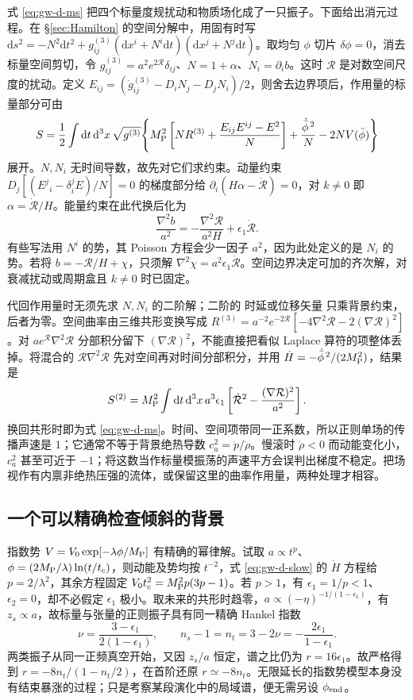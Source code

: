式 \eqref{eq:gw-d-ms} 把四个标量度规扰动和物质场化成了一只振子。下面给出消元过程。在 \S\ref{sec:Hamilton} 的空间分解中，用固有时写 $\mathrm ds^2=-N^2\mathrm dt^2+g^{(3)}_{ij}(\mathrm dx^i+N^i\mathrm dt)(\mathrm dx^j+N^j\mathrm dt)$。取均匀 $\phi$ 切片 $\delta\phi=0$，消去标量空间剪切，令 $g^{(3)}_{ij}=a^2e^{2\mathcal R}\delta_{ij}$、$N=1+\alpha$、$N_i=\partial_i b$。这时 $\mathcal R$ 是对数空间尺度的扰动。定义 $E_{ij}=(\dot g^{(3)}_{ij}-D_iN_j-D_jN_i)/2$，则舍去边界项后，作用量的标量部分可由
\[
 S=\frac12\int\mathrm dt\,\mathrm d^3x\,\sqrt{g^{(3)}}\!
 \left\{M_{\rm P}^2\left[N R^{(3)}+\frac{E_{ij}E^{ij}-E^2}{N}\right]
       +\frac{\dot{\bar\phi}^{\,2}}{N}-2NV(\bar\phi)\right\}
\]
展开。$N,N_i$ 无时间导数，故先对它们求约束。动量约束 $D_j[(E^j{}_i-\delta^j_i E)/N]=0$ 的梯度部分给 $\partial_i(H\alpha-\dot{\mathcal R})=0$，对 $k\ne0$ 即 $\alpha=\dot{\mathcal R}/H$。能量约束在此代换后化为
\[
 \frac{\nabla^2 b}{a^2}=-\frac{\nabla^2\mathcal R}{a^2H}
                       +\epsilon_1\dot{\mathcal R}.
\]
有些写法用 $N^i$ 的势，其 Poisson 方程会少一因子 $a^2$，因为此处定义的是 $N_i$ 的势。若将 $b=-\mathcal R/H+\chi$，只须解 $\nabla^2\chi=a^2\epsilon_1\dot{\mathcal R}$。空间边界决定可加的齐次解，对衰减扰动或周期盒且 $k\ne0$ 时已固定。

代回作用量时无须先求 $N,N_i$ 的二阶解；二阶的 时延或位移矢量 只乘背景约束，后者为零。空间曲率由三维共形变换写成 $R^{(3)}=a^{-2}e^{-2\mathcal R}[-4\nabla^2\mathcal R-2(\nabla\mathcal R)^2]$。对 $a e^{\mathcal R}\nabla^2\mathcal R$ 分部积分留下 $(\nabla\mathcal R)^2$，不能直接把看似 Laplace 算符的项整体丢掉。将混合的 $\dot{\mathcal R}\nabla^2\mathcal R$ 先对空间再对时间分部积分，并用 $\dot H=-\dot{\bar\phi}^{\,2}/(2M_{\rm P}^2)$，结果是
\[
 S^{(2)}=M_{\rm P}^2\int\mathrm dt\,\mathrm d^3x\,a^3\epsilon_1
 \left[\dot{\mathcal R}^2-\frac{(\nabla\mathcal R)^2}{a^2}\right].
\]
换回共形时即为式 \eqref{eq:gw-d-ms}。时间、空间项带同一正系数，所以正则单场的传播声速是 $1$；它通常不等于背景绝热导数 $c_a^2=\dot p/\dot\rho$。慢滚时 $\dot\rho<0$ 而动能变化小，$c_a^2$ 甚至可近于 $-1$；将这数当作标量模振荡的声速平方会误判出梯度不稳定。把场视作有内禀非绝热压强的流体，或保留这里的曲率作用量，两种处理才相容。

\subsection{一个可以精确检查倾斜的背景}

指数势 $V=V_0\exp[-\lambda\phi/M_{\rm P}]$ 有精确的幂律解。试取 $a\propto t^p$、$\phi=(2M_{\rm P}/\lambda)\ln(t/t_c)$，则动能及势均按 $t^{-2}$，式 \eqref{eq:gw-d-slow} 的 $\dot H$ 方程给 $p=2/\lambda^2$，其余方程固定 $V_0t_c^2=M_{\rm P}^2p(3p-1)$。若 $p>1$，有 $\epsilon_1=1/p<1$、$\epsilon_2=0$，却不必假定 $\epsilon_1$ 极小。取未来的共形时趋零，$a\propto(-\eta)^{-1/(1-\epsilon_1)}$，有 $z_s\propto a$，故标量与张量的正则振子具有同一精确 Hankel 指数
\[
 \nu=\frac{3-\epsilon_1}{2(1-\epsilon_1)},\qquad
 n_s-1=n_t=3-2\nu=-\frac{2\epsilon_1}{1-\epsilon_1}.
\]
两类振子从同一正频真空开始，又因 $z_s/a$ 恒定，谱之比仍为 $r=16\epsilon_1$。故严格得到 $r=-8n_t/(1-n_t/2)$，在首阶还原 $r\simeq-8n_t$。无限延长的指数势模型本身没有结束暴涨的过程；只是考察某段演化中的局域谱，便无需另设 $\phi_{\rm end}$。

